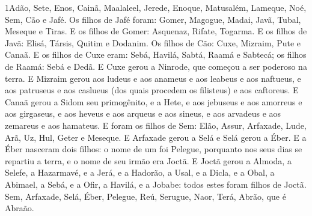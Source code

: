 
\lettrine{1} Adão, Sete, Enos, Cainã, Maalaleel, Jerede,
Enoque, Matusalém, Lameque, Noé, Sem, Cão e Jafé. Os
filhos de Jafé foram: Gomer, Magogue, Madai, Javã, Tubal, Meseque e
Tiras. E os filhos de Gomer: Asquenaz, Rifate, Togarma. E os
filhos de Javã: Elisá, Társis, Quitim e Dodanim. Os filhos de
Cão: Cuxe, Mizraim, Pute e Canaã. E os filhos de Cuxe eram:
Sebá, Havilá, Sabtá, Raamá e Sabtecá; os filhos de Raamá: Sebá e
Dedã. E Cuxe gerou a Ninrode, que começou a ser poderoso na
terra. E Mizraim gerou aos ludeus e aos anameus e aos leabeus
e aos naftueus, e aos patruseus e aos caslueus (dos quais
procedem os filisteus) e aos caftoreus. E Canaã gerou a Sidom
seu primogênito, e a Hete, e aos jebuseus e aos amorreus e
aos girgaseus, e aos heveus e aos arqueus e aos sineus,
e aos arvadeus e aos zemareus e aos hamateus. E foram
os filhos de Sem: Elão, Assur, Arfaxade, Lude, Arã, Uz, Hul, Geter e
Meseque. E Arfaxade gerou a Selá e Selá gerou a Éber.
E a Éber nasceram dois filhos: o nome de um foi Pelegue,
porquanto nos seus dias se repartiu a terra, e o nome de seu irmão
era Joctã. E Joctã gerou a Almoda, a Selefe, a Hazarmavé, e a
Jerá, e a Hadorão, a Usal, e a Dicla, e a Obal, a
Abimael, a Sebá, e a Ofir, a Havilá, e a Jobabe: todos estes
foram filhos de Joctã. Sem, Arfaxade, Selá, Éber,
Pelegue, Reú, Serugue, Naor, Terá, Abrão, que é
Abraão.

